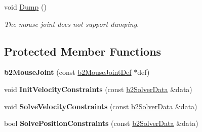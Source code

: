 \begin{DoxyCompactItemize}
\item 
\hypertarget{classb2_mouse_joint_ae3d3a46a0032c0e50f346e7f7129617f}{void \hyperlink{classb2_mouse_joint_ae3d3a46a0032c0e50f346e7f7129617f}{Dump} ()}\label{classb2_mouse_joint_ae3d3a46a0032c0e50f346e7f7129617f}

\begin{DoxyCompactList}\small\item\em The mouse joint does not support dumping. \end{DoxyCompactList}\end{DoxyCompactItemize}
\subsection*{Protected Member Functions}
\begin{DoxyCompactItemize}
\item 
\hypertarget{classb2_mouse_joint_ad147d7989d884952c3389f7e5e3acf68}{{\bfseries b2\-Mouse\-Joint} (const \hyperlink{structb2_mouse_joint_def}{b2\-Mouse\-Joint\-Def} $\ast$def)}\label{classb2_mouse_joint_ad147d7989d884952c3389f7e5e3acf68}

\item 
\hypertarget{classb2_mouse_joint_a81fbb58a52c3cea00fb25817d04d16e6}{void {\bfseries Init\-Velocity\-Constraints} (const \hyperlink{structb2_solver_data}{b2\-Solver\-Data} \&data)}\label{classb2_mouse_joint_a81fbb58a52c3cea00fb25817d04d16e6}

\item 
\hypertarget{classb2_mouse_joint_a94efc95b4ab292d1cc193c6edbb362a2}{void {\bfseries Solve\-Velocity\-Constraints} (const \hyperlink{structb2_solver_data}{b2\-Solver\-Data} \&data)}\label{classb2_mouse_joint_a94efc95b4ab292d1cc193c6edbb362a2}

\item 
\hypertarget{classb2_mouse_joint_a990ed3aaa5092ab92180b8ec3c3df342}{bool {\bfseries Solve\-Position\-Constraints} (const \hyperlink{structb2_solver_data}{b2\-Solver\-Data} \&data)}\label{classb2_mouse_joint_a990ed3aaa5092ab92180b8ec3c3df342}

\end{DoxyCompactItemize}
